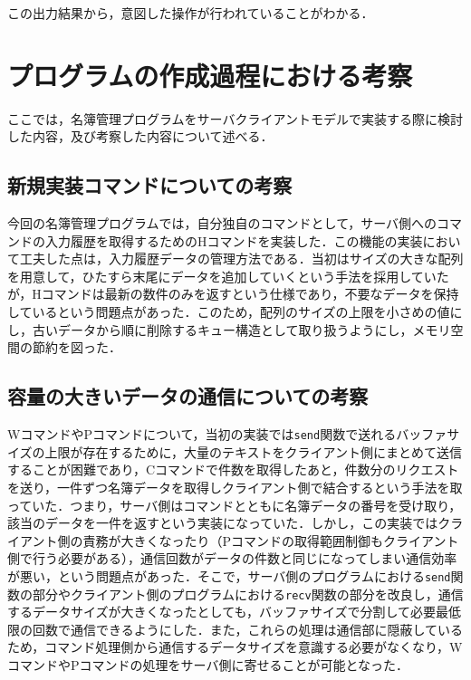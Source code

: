 \documentclass[11pt]{jsarticle}
\begin{document}
この出力結果から，意図した操作が行われていることがわかる．

\section{プログラムの作成過程における考察}

ここでは，名簿管理プログラムをサーバクライアントモデルで実装する際に検討した内容，及び考察した内容について述べる．

\subsection{新規実装コマンドについての考察}

今回の名簿管理プログラムでは，自分独自のコマンドとして，サーバ側へのコマンドの入力履歴を取得するためのHコマンドを実装した．この機能の実装において工夫した点は，入力履歴データの管理方法である．当初はサイズの大きな配列を用意して，ひたすら末尾にデータを追加していくという手法を採用していたが，Hコマンドは最新の数件のみを返すという仕様であり，不要なデータを保持しているという問題点があった．このため，配列のサイズの上限を小さめの値にし，古いデータから順に削除するキュー構造として取り扱うようにし，メモリ空間の節約を図った．

\subsection{容量の大きいデータの通信についての考察}

WコマンドやPコマンドについて，当初の実装では{\tt send}関数で送れるバッファサイズの上限が存在するために，大量のテキストをクライアント側にまとめて送信することが困難であり，Cコマンドで件数を取得したあと，件数分のリクエストを送り，一件ずつ名簿データを取得しクライアント側で結合するという手法を取っていた．つまり，サーバ側はコマンドとともに名簿データの番号を受け取り，該当のデータを一件を返すという実装になっていた．しかし，この実装ではクライアント側の責務が大きくなったり（Pコマンドの取得範囲制御もクライアント側で行う必要がある），通信回数がデータの件数と同じになってしまい通信効率が悪い，という問題点があった．そこで，サーバ側のプログラムにおける{\tt send}関数の部分やクライアント側のプログラムにおける{\tt recv}関数の部分を改良し，通信するデータサイズが大きくなったとしても，バッファサイズで分割して必要最低限の回数で通信できるようにした．また，これらの処理は通信部に隠蔽しているため，コマンド処理側から通信するデータサイズを意識する必要がなくなり，WコマンドやPコマンドの処理をサーバ側に寄せることが可能となった．
\end{document}
